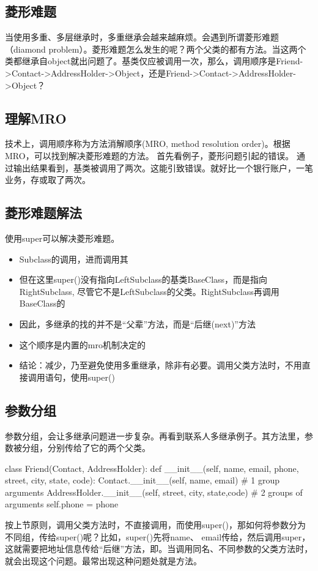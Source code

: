 \begin{python}
\subsection{菱形难题}
当使用多重、多层继承时，多重继承会越来越麻烦。会遇到所谓菱形难题（diamond problem）。菱形难题怎么发生的呢？两个父类的都有方法。当这两个类都继承自object就出问题了。基类仅应被调用一次，那么，调用顺序是Friend->Contact->AddressHolder->Object，还是Friend->Contact->AddressHolder->Object？
\subsection{理解MRO}
技术上，调用顺序称为方法消解顺序(MRO, method resolution order)。根据MRO，可以找到解决菱形难题的方法。
首先看例子，菱形问题引起的错误。
通过输出结果看到，基类被调用了两次。这能引致错误。就好比一个银行账户，一笔业务，存或取了两次。
\subsection{菱形难题解法}
使用super可以解决菱形难题。
\begin{itemize}
\item Subclass的调用，进而调用其
\item 但在这里super()没有指向LeftSubclass的基类BaseClass，而是指向RightSubclass, 尽管它不是LeftSubclass的父类。RightSubclass再调用BaseClass的
\item 因此，多继承的找的并不是“父辈”方法，而是“后继(next)”方法
\item 这个顺序是内置的mro机制决定的
\item 结论：减少，乃至避免使用多重继承，除非有必要。调用父类方法时，不用直接调用语句，使用super()
\end{itemize}
\subsection{参数分组}
参数分组，会让多继承问题进一步复杂。再看到联系人多继承例子。其方法里，参数被分组，分别传给了它的两个父类。
\begin{python}
class Friend(Contact, AddressHolder):
    def __init__(self,
                name,
                email,
                phone,
                street,
                city,
                state,
                code):
        Contact.__init__(self, name, email)  # 1 group arguments
        AddressHolder.__init__(self, street, city, state,code)  # 2 groups of arguments
        self.phone = phone
\end{python}
按上节原则，调用父类方法时，不直接调用，而使用super()，那如何将参数分为不同组，传给super()呢？比如，super()先将name、 email传给，然后调用super，这就需要把地址信息传给“后继”方法，即。当调用同名、不同参数的父类方法时，就会出现这个问题。最常出现这种问题处就是方法。


\end{python}
